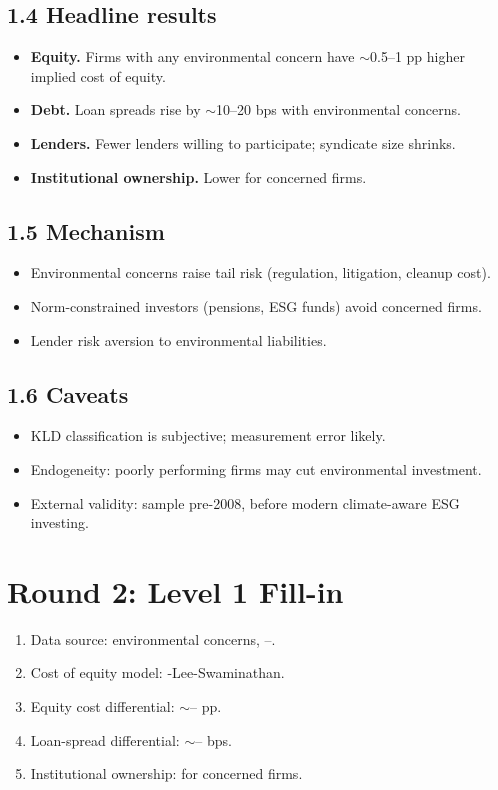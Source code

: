 \documentclass[11pt]{article}
\newcommand{\blank}[1]{\underline{\hspace{#1}}}
\begin{document}
\subsection*{1.4 Headline results}
\begin{itemize}
\item \textbf{Equity.} Firms with any environmental concern have $\sim$0.5--1 pp higher implied cost of equity.
\item \textbf{Debt.} Loan spreads rise by $\sim$10--20 bps with environmental concerns.
\item \textbf{Lenders.} Fewer lenders willing to participate; syndicate size shrinks.
\item \textbf{Institutional ownership.} Lower for concerned firms.
\end{itemize}

\subsection*{1.5 Mechanism}
\begin{itemize}
\item Environmental concerns raise tail risk (regulation, litigation, cleanup cost).
\item Norm-constrained investors (pensions, ESG funds) avoid concerned firms.
\item Lender risk aversion to environmental liabilities.
\end{itemize}

\subsection*{1.6 Caveats}
\begin{alertbox}
\begin{itemize}
\item KLD classification is subjective; measurement error likely.
\item Endogeneity: poorly performing firms may cut environmental investment.
\item External validity: sample pre-2008, before modern climate-aware ESG investing.
\end{itemize}
\end{alertbox}

\section*{Round 2: Level 1 Fill-in}
\begin{enumerate}
\item Data source: \blank{1cm} environmental concerns, \blank{1cm}--\blank{1cm}.
\item Cost of equity model: \blank{2cm}-Lee-Swaminathan.
\item Equity cost differential: $\sim$\blank{1cm}--\blank{1cm} pp.
\item Loan-spread differential: $\sim$\blank{1cm}--\blank{1cm} bps.
\item Institutional ownership: \blank{1cm} for concerned firms.
\end{enumerate}
\end{document}
